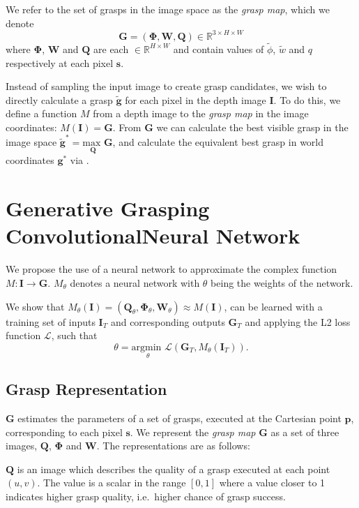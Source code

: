 \documentclass[conference]{IEEEtran}
\newcommand{\cG}{\mathbf{G}}
\newcommand{\cL}{\mathcal{L}}
\newcommand{\cQ}{\mathbf{Q}}
\newcommand{\cW}{\mathbf{W}}
\newcommand{\bbR}{\mathbb{R}}
\newcommand{\fM}{M}
\newcommand{\bPhi}{\mathbf{\Phi}}
\newcommand{\bg}{\mathbf{g}}
\newcommand{\bgt}{\tilde{\mathbf{g}}}
\newcommand{\bp}{\mathbf{p}}
\newcommand{\bs}{\mathbf{s}}
\newcommand{\by}{\mathbf{I}}
\begin{document}
We refer to the set of grasps in the image space as the \textit{grasp map}, which we denote
\begin{equation*}
    \cG = (\bPhi, \cW, \cQ) \in \bbR^{3 \times H \times W}
\end{equation*}
where $\bPhi$, $\cW$ and $\cQ$ are each $\in \bbR^{H \times W}$ and contain values of $\tilde{\phi}$, $\tilde{w}$ and $q$ respectively at each pixel $\bs$.

Instead of sampling the input image to create grasp candidates, we wish to directly calculate a grasp $\bgt$ for each pixel in the depth image $\by$.  To do this, we define a function $\fM$ from a depth image to the \textit{grasp map} in the image coordinates: $\fM(\by) = \cG$.  From $\cG$ we can calculate the best visible grasp in the image space $\tilde{\bg}^* = \underset{\cQ}{\text{max }}\cG$, and calculate the equivalent best grasp in world coordinates $\bg^*$ via . 


\section{Generative Grasping Convolutional\newline Neural Network}

We propose the use of a neural network to approximate the complex function $\fM: \by \to \cG$.
$\fM_\theta$ denotes a neural network with $\theta$ being the weights of the network.

We show that $\fM_\theta(\by) = (\cQ_\theta, \bPhi_\theta, \cW_\theta ) \approx \fM(\by)$, can be learned with a training set of inputs $\by_T$ and corresponding outputs $\cG_T$ and applying the L2 loss function $\cL$, such that 
\begin{equation*}
    \theta = \underset{\theta}{\text{argmin }}\cL(\cG_T, \fM_\theta(\by_T)).
\end{equation*}


\subsection{Grasp Representation}
$\cG$ estimates the parameters of a set of grasps, executed at the Cartesian point $\bp$, corresponding to each pixel $\bs$.
We represent the \textit{grasp map} $\cG$ as a set of three images, $\cQ$, $\bPhi$ and $\cW$. 
The representations are as follows:

$\cQ$ is an image which describes the quality of a grasp executed at each point $(u,v)$.  The value is a scalar in the range $[0, 1]$ where a value closer to 1 indicates higher grasp quality, i.e.\ higher chance of grasp success.
\end{document}
